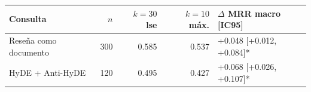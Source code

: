 \begin{tabular}{lrrrl}
\toprule
Consulta & $n$ & $k=30$ lse & $k=10$ máx. & $\Delta$ MRR macro [IC95] \\
\midrule
Reseña como documento & 300 & 0.585 & 0.537 & +0.048 [+0.012, +0.084]* \\
HyDE + Anti-HyDE & 120 & 0.495 & 0.427 & +0.068 [+0.026, +0.107]* \\
\bottomrule
\end{tabular}
